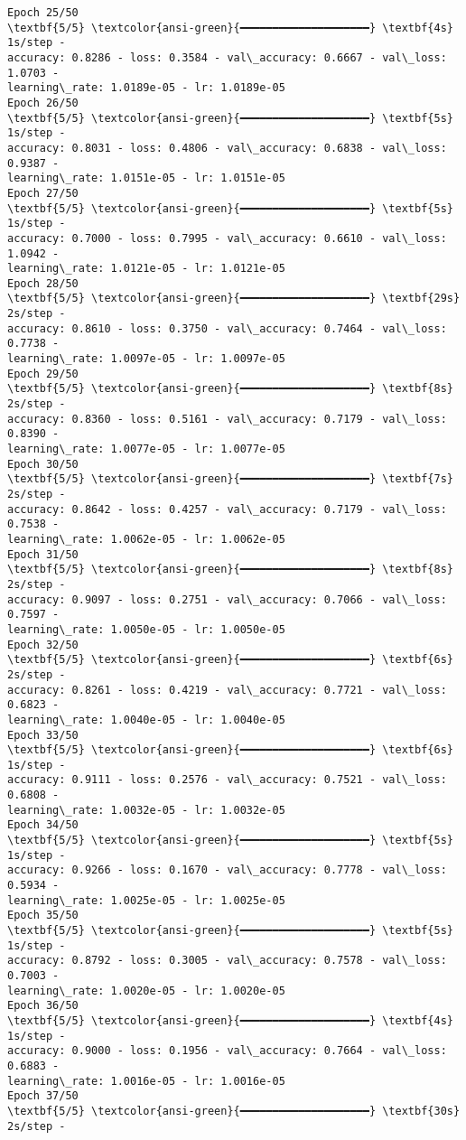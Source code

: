 \documentclass[11pt]{article}
\begin{document}
\begin{Verbatim}[commandchars=\\\{\}]
Epoch 25/50
\textbf{5/5} \textcolor{ansi-green}{━━━━━━━━━━━━━━━━━━━━} \textbf{4s} 1s/step -
accuracy: 0.8286 - loss: 0.3584 - val\_accuracy: 0.6667 - val\_loss: 1.0703 -
learning\_rate: 1.0189e-05 - lr: 1.0189e-05
Epoch 26/50
\textbf{5/5} \textcolor{ansi-green}{━━━━━━━━━━━━━━━━━━━━} \textbf{5s} 1s/step -
accuracy: 0.8031 - loss: 0.4806 - val\_accuracy: 0.6838 - val\_loss: 0.9387 -
learning\_rate: 1.0151e-05 - lr: 1.0151e-05
Epoch 27/50
\textbf{5/5} \textcolor{ansi-green}{━━━━━━━━━━━━━━━━━━━━} \textbf{5s} 1s/step -
accuracy: 0.7000 - loss: 0.7995 - val\_accuracy: 0.6610 - val\_loss: 1.0942 -
learning\_rate: 1.0121e-05 - lr: 1.0121e-05
Epoch 28/50
\textbf{5/5} \textcolor{ansi-green}{━━━━━━━━━━━━━━━━━━━━} \textbf{29s} 2s/step -
accuracy: 0.8610 - loss: 0.3750 - val\_accuracy: 0.7464 - val\_loss: 0.7738 -
learning\_rate: 1.0097e-05 - lr: 1.0097e-05
Epoch 29/50
\textbf{5/5} \textcolor{ansi-green}{━━━━━━━━━━━━━━━━━━━━} \textbf{8s} 2s/step -
accuracy: 0.8360 - loss: 0.5161 - val\_accuracy: 0.7179 - val\_loss: 0.8390 -
learning\_rate: 1.0077e-05 - lr: 1.0077e-05
Epoch 30/50
\textbf{5/5} \textcolor{ansi-green}{━━━━━━━━━━━━━━━━━━━━} \textbf{7s} 2s/step -
accuracy: 0.8642 - loss: 0.4257 - val\_accuracy: 0.7179 - val\_loss: 0.7538 -
learning\_rate: 1.0062e-05 - lr: 1.0062e-05
Epoch 31/50
\textbf{5/5} \textcolor{ansi-green}{━━━━━━━━━━━━━━━━━━━━} \textbf{8s} 2s/step -
accuracy: 0.9097 - loss: 0.2751 - val\_accuracy: 0.7066 - val\_loss: 0.7597 -
learning\_rate: 1.0050e-05 - lr: 1.0050e-05
Epoch 32/50
\textbf{5/5} \textcolor{ansi-green}{━━━━━━━━━━━━━━━━━━━━} \textbf{6s} 2s/step -
accuracy: 0.8261 - loss: 0.4219 - val\_accuracy: 0.7721 - val\_loss: 0.6823 -
learning\_rate: 1.0040e-05 - lr: 1.0040e-05
Epoch 33/50
\textbf{5/5} \textcolor{ansi-green}{━━━━━━━━━━━━━━━━━━━━} \textbf{6s} 1s/step -
accuracy: 0.9111 - loss: 0.2576 - val\_accuracy: 0.7521 - val\_loss: 0.6808 -
learning\_rate: 1.0032e-05 - lr: 1.0032e-05
Epoch 34/50
\textbf{5/5} \textcolor{ansi-green}{━━━━━━━━━━━━━━━━━━━━} \textbf{5s} 1s/step -
accuracy: 0.9266 - loss: 0.1670 - val\_accuracy: 0.7778 - val\_loss: 0.5934 -
learning\_rate: 1.0025e-05 - lr: 1.0025e-05
Epoch 35/50
\textbf{5/5} \textcolor{ansi-green}{━━━━━━━━━━━━━━━━━━━━} \textbf{5s} 1s/step -
accuracy: 0.8792 - loss: 0.3005 - val\_accuracy: 0.7578 - val\_loss: 0.7003 -
learning\_rate: 1.0020e-05 - lr: 1.0020e-05
Epoch 36/50
\textbf{5/5} \textcolor{ansi-green}{━━━━━━━━━━━━━━━━━━━━} \textbf{4s} 1s/step -
accuracy: 0.9000 - loss: 0.1956 - val\_accuracy: 0.7664 - val\_loss: 0.6883 -
learning\_rate: 1.0016e-05 - lr: 1.0016e-05
Epoch 37/50
\textbf{5/5} \textcolor{ansi-green}{━━━━━━━━━━━━━━━━━━━━} \textbf{30s} 2s/step -

\end{Verbatim}
\end{document}
